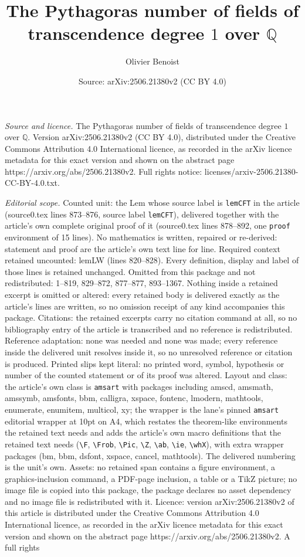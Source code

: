 \documentclass[10pt,a4paper]{amsart}
\title[The Pythagoras number of fields of transcendence degree $1$ ]{The Pythagoras number of fields of transcendence degree $1$ over $\mathbb{Q}$}
\author{Olivier Benoist}
\date{Source: arXiv:2506.21380v2 (CC BY 4.0)}
\begin{document}
\maketitle

\noindent\emph{Source and licence.} The Pythagoras number of fields of transcendence degree $1$ over $\mathbb{Q}$. Version arXiv:2506.21380v2 (CC BY 4.0), distributed under the Creative Commons Attribution 4.0 International licence, as recorded in the arXiv licence metadata for this exact version and shown on the abstract page https://arxiv.org/abs/2506.21380v2. Full rights notice: licenses/arxiv-2506.21380-CC-BY-4.0.txt.\par\smallskip

\noindent\textit{Editorial scope.} Counted unit: the Lem whose source label is \texttt{lemCFT} in the article (source0.tex lines 873--876, source label \texttt{lemCFT}), delivered together with the article's own complete original proof of it (source0.tex lines 878--892, one \texttt{proof} environment of 15 lines). No mathematics is written, repaired or re-derived: statement and proof are the article's own text line for line. Required context retained uncounted: lemLW (lines 820--828). Every definition, display and label of those lines is retained unchanged. Omitted from this package and not redistributed: 1--819, 829--872, 877--877, 893--1367. Nothing inside a retained excerpt is omitted or altered: every retained body is delivered exactly as the article's lines are written, so no omission receipt of any kind accompanies this package. Citations: the retained excerpts carry no citation command at all, so no bibliography entry of the article is transcribed and no reference is redistributed. Reference adaptation: none was needed and none was made; every reference inside the delivered unit resolves inside it, so no unresolved reference or citation is produced. Printed slips kept literal: no printed word, symbol, hypothesis or number of the counted statement or of its proof was altered. Layout and class: the article's own class is \texttt{amsart} with packages including amscd, amsmath, amssymb, amsfonts, bbm, calligra, xspace, fontenc, lmodern, mathtools, enumerate, enumitem, multicol, xy; the wrapper is the lane's pinned \texttt{amsart} editorial wrapper at 10pt on A4, which restates the theorem-like environments the retained text needs and adds the article's own macro definitions that the retained text needs (\texttt{\textbackslash F}, \texttt{\textbackslash Frob}, \texttt{\textbackslash Pic}, \texttt{\textbackslash Z}, \texttt{\textbackslash ab}, \texttt{\textbackslash ie}, \texttt{\textbackslash whX}), with extra wrapper packages (bm, bbm, dsfont, xspace, cancel, mathtools). The delivered numbering is the unit's own. Assets: no retained span contains a figure environment, a graphics-inclusion command, a PDF-page inclusion, a table or a TikZ picture; no image file is copied into this package, the package declares no asset dependency and no image file is redistributed with it. Licence: version arXiv:2506.21380v2 of this article is distributed under the Creative Commons Attribution 4.0 International licence, as recorded in the arXiv licence metadata for this exact version and shown on the abstract page https://arxiv.org/abs/2506.21380v2. A full rights 
\end{document}
